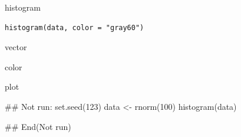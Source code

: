 \documentclass[a4paper]{book}
\begin{document}
%
\begin{Description}
histogram
\end{Description}
%
\begin{Usage}
\begin{verbatim}
histogram(data, color = "gray60")
\end{verbatim}
\end{Usage}
%
\begin{Arguments}
\begin{ldescription}
\item[\code{data}] vector

\item[\code{color}] color
\end{ldescription}
\end{Arguments}
%
\begin{Value}
plot
\end{Value}
%
\begin{Examples}
\begin{ExampleCode}
\#\# Not run: 
set.seed(123)
data <- rnorm(100)
histogram(data)


## End(Not run)

\end{ExampleCode}
\end{Examples}
\end{document}
